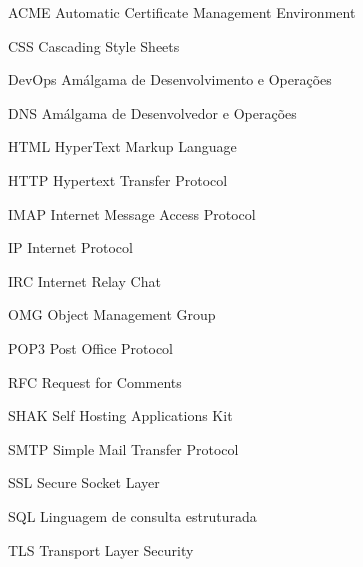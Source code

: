 \begin{siglas}
  \item[ACME] Automatic Certificate Management Environment
  \item[CSS] Cascading Style Sheets
  \item[DevOps] Amálgama de Desenvolvimento e Operações
  \item[DNS] Amálgama de Desenvolvedor e Operações
  \item[HTML] HyperText Markup Language
  \item[HTTP] Hypertext Transfer Protocol
  \item[IMAP] Internet Message Access Protocol
  \item[IP] Internet Protocol
  \item[IRC] Internet Relay Chat
  \item[OMG] Object Management Group
  \item[POP3] Post Office Protocol 
  \item[RFC] Request for Comments
  \item[SHAK] Self Hosting Applications Kit
  \item[SMTP] Simple Mail Transfer Protocol
  \item[SSL] Secure Socket Layer
  \item[SQL] Linguagem de consulta estruturada
  \item[TLS] Transport Layer Security
\end{siglas}
